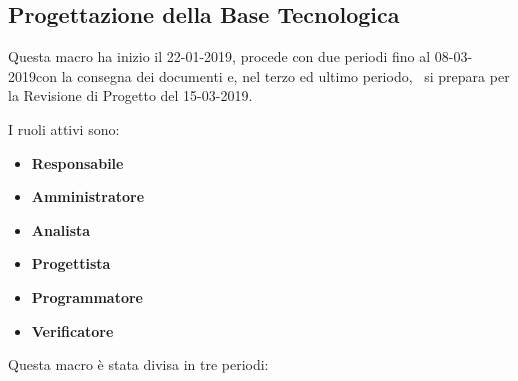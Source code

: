 		\newpage
		
        \subsection{Progettazione della Base Tecnologica}
		Questa macro ha inizio il 22-01-2019, procede con due periodi fino al 08-03-2019con la consegna
		dei documenti e, nel terzo ed ultimo periodo, \gruppo\ si prepara per la Revisione di Progetto del 15-03-2019.
        
        I ruoli attivi sono: 
        \begin{itemize}
            \item \textbf{Responsabile}
            \item \textbf{Amministratore}
            \item \textbf{Analista}
            \item \textbf{Progettista}
            \item \textbf{Programmatore}
            \item \textbf{Verificatore}
        \end{itemize}
        Questa macro è stata divisa in tre periodi:
